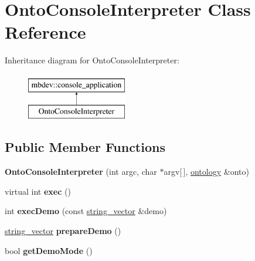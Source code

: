 \hypertarget{class_onto_console_interpreter}{\section{\-Onto\-Console\-Interpreter \-Class \-Reference}
\label{class_onto_console_interpreter}
}
\-Inheritance diagram for \-Onto\-Console\-Interpreter\-:\begin{figure}[H]
\begin{center}
\leavevmode
\includegraphics[height=2.000000cm]{class_onto_console_interpreter}
\end{center}
\end{figure}
\subsection*{\-Public \-Member \-Functions}
\begin{DoxyCompactItemize}
\item 
\hypertarget{class_onto_console_interpreter_a98b49ac4c997e2e85716ce48997aa3d7}{{\bfseries \-Onto\-Console\-Interpreter} (int argc, char $\ast$argv\mbox{[}$\,$\mbox{]}, \hyperlink{classmbdev__ontology_1_1ontology}{ontology} \&onto)}\label{class_onto_console_interpreter_a98b49ac4c997e2e85716ce48997aa3d7}

\item 
\hypertarget{class_onto_console_interpreter_a74c7b8d7b4f40c12f21370e8248c9660}{virtual int {\bfseries exec} ()}\label{class_onto_console_interpreter_a74c7b8d7b4f40c12f21370e8248c9660}

\item 
\hypertarget{class_onto_console_interpreter_abc3300ff9602a7ef8c3d8a8a7f5cec29}{int {\bfseries exec\-Demo} (const \hyperlink{classmbdev_1_1string__vector}{string\-\_\-vector} \&demo)}\label{class_onto_console_interpreter_abc3300ff9602a7ef8c3d8a8a7f5cec29}

\item 
\hypertarget{class_onto_console_interpreter_a381c04f051a51213cd9982a10e5f67e1}{\hyperlink{classmbdev_1_1string__vector}{string\-\_\-vector} {\bfseries prepare\-Demo} ()}\label{class_onto_console_interpreter_a381c04f051a51213cd9982a10e5f67e1}

\item 
\hypertarget{class_onto_console_interpreter_a54bf92dfb045e18a2e798fa288ebe6f3}{bool {\bfseries get\-Demo\-Mode} ()}\label{class_onto_console_interpreter_a54bf92dfb045e18a2e798fa288ebe6f3}

\end{DoxyCompactItemize}
